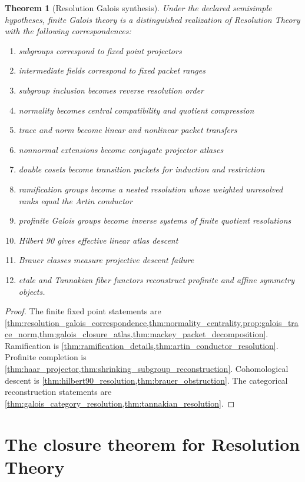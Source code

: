 \documentclass{aomart}
\newtheorem{theorem}{Theorem}[section]
\theoremstyle{definition}
\theoremstyle{remark}
\begin{document}
\begin{theorem}[Resolution Galois synthesis]\label{thm:resolution_galois_synthesis}
Under the declared semisimple hypotheses, finite Galois theory is a distinguished realization of Resolution Theory with the following correspondences:
\begin{enumerate}
\item subgroups correspond to fixed point projectors
\item intermediate fields correspond to fixed packet ranges
\item subgroup inclusion becomes reverse resolution order
\item normality becomes central compatibility and quotient compression
\item trace and norm become linear and nonlinear packet transfers
\item nonnormal extensions become conjugate projector atlases
\item double cosets become transition packets for induction and restriction
\item ramification groups become a nested resolution whose weighted unresolved ranks equal the Artin conductor
\item profinite Galois groups become inverse systems of finite quotient resolutions
\item Hilbert 90 gives effective linear atlas descent
\item Brauer classes measure projective descent failure
\item etale and Tannakian fiber functors reconstruct profinite and affine symmetry objects.
\end{enumerate}
\end{theorem}

\begin{proof}
The finite fixed point statements are \cref{thm:resolution_galois_correspondence,thm:normality_centrality,prop:galois_trace_norm,thm:galois_closure_atlas,thm:mackey_packet_decomposition}. Ramification is \cref{thm:ramification_details,thm:artin_conductor_resolution}. Profinite completion is \cref{thm:haar_projector,thm:shrinking_subgroup_reconstruction}. Cohomological descent is \cref{thm:hilbert90_resolution,thm:brauer_obstruction}. The categorical reconstruction statements are \cref{thm:galois_category_resolution,thm:tannakian_resolution}.
\end{proof}

\section{The closure theorem for Resolution Theory}\label{sec:closure}
\end{document}

